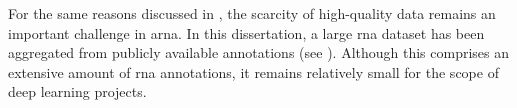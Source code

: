 

For the same reasons discussed in
, the scarcity of
high-quality data remains an important challenge in
\gls{arna}. In this dissertation, a large \gls{rna} dataset
has been aggregated from publicly available annotations (see
). Although this comprises
an extensive amount of \gls{rna} annotations, it remains
relatively small for the scope of deep learning projects.
